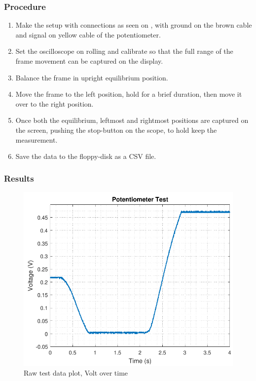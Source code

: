\subsubsection{Procedure}
\begin{enumerate}
  \item Make the setup with connections as seen on , with ground on the brown cable and signal on yellow cable of the potentiometer.
  \item Set the oscilloscope on rolling and calibrate so that the full range of the frame movement can be captured on the display.
  \item Balance the frame in upright equilibrium position.
	\item Move the frame to the left position, hold for a brief duration, then move it over to the right position.
	\item Once both the equilibrium, leftmost and rightmost positions are captured on the screen, pushing the stop-button on the scope, to hold keep the measurement.
	\item Save the data to the floppy-disk as a CSV file.
\end{enumerate}

\subsubsection{Results}
\begin{figure}[H] 
	\centering 
	\includegraphics[scale=0.7]{figures/TestPotentiometerResolution}
	\caption{Raw test data plot, Volt over time}
	\label{comparisonRealModel}
\end{figure}